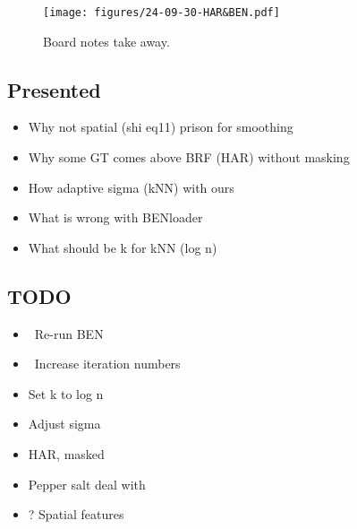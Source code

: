 
\begin{figure}[htbp]
    \centering
    \texttt{[image: figures/24-09-30-HAR\&BEN.pdf]}
    \caption{Board notes take away.}
    \label{fig:24-09-30-HAR&BEN}
\end{figure}

\begin{multicols}{2}
\subsection*{Presented}
\begin{itemize}
    \item Why not spatial (shi eq11) prison for smoothing 
    \item Why some GT comes above BRF (HAR) without masking
    \item How adaptive sigma (kNN) with ours
    \item What is wrong with BENloader
    \item What should be k for kNN (log n)
\end{itemize}

\subsection*{TODO}
\begin{itemize}
    \item \checkmark \ Re-run BEN
    \item \checkmark \ Increase iteration numbers
    \item Set k to log n
    \item Adjust sigma
    \item HAR, masked
    \item Pepper salt deal with
    \item ? Spatial features 
\end{itemize}
\end{multicols}

\newpage



